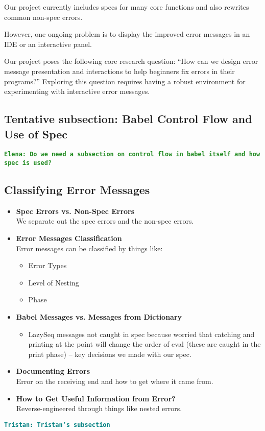\documentclass[12pt]{article}
\newcommand{\comment}[1]{{\bf \tt  {#1}}}
\newcommand{\emcomment}[1]{\textcolor{ForestGreen}{\comment{Elena: {#1}}}}
\newcommand{\tkcomment}[1]{\textcolor{Teal}{\comment{Tristan: {#1}}}}
\begin{document}
Our project currently includes specs for many core functions and also rewrites common non-spec errors. 

However, one ongoing problem is to display the improved error messages in an IDE or an interactive panel. 

Our project poses the following core research question: 
``How can we design error message presentation and interactions to help beginners fix errors in their programs?'' 
Exploring this question requires having a robust environment for experimenting with interactive error messages.

\subsection{Tentative subsection: Babel Control Flow and Use of Spec}\label{subsec:control-flow}
\emcomment{Do we need a subsection on control flow in babel itself and how spec is used?}

\subsection{Classifying Error Messages}\label{subsec:classification}
\begin{itemize}
    \item \textbf{Spec Errors vs. Non-Spec Errors} \\
    We separate out the spec errors and the non-spec errors.

    \item \textbf{Error Messages Classification} \\
    Error messages can be classified by things like:
    \begin{itemize}
        \item Error Types
        \item Level of Nesting
        \item Phase
    \end{itemize}

    \item \textbf{Babel Messages vs. Messages from Dictionary} \\
    \begin{itemize}
        \item LazySeq messages not caught in spec because worried that catching and printing at the point will change the order of eval (these are caught in the print phase) -- key decisions we made with our spec.
    \end{itemize}

    \item \textbf{Documenting Errors} \\
    Error on the receiving end and how to get where it came from.

    \item \textbf{How to Get Useful Information from Error?} \\
    Reverse-engineered through things like nested errors.

\end{itemize}
\tkcomment{Tristan's subsection}
\end{document}
